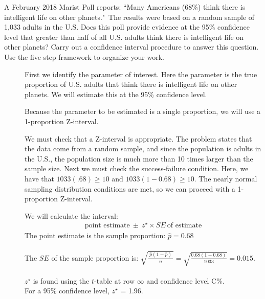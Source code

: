 \begin{examplewrap}
\begin{nexample}
{A February 2018 Marist Poll reports:  ``Many Americans (68\%) think there is intelligent life on other planets."\footnotemark\,  The results were based on a random sample of 1,033 adults in the U.S.  Does this poll provide evidence at the 95\% confidence level that greater than half of all U.S. adults think there is intelligent life on other planets?  Carry out a confidence interval procedure to answer this question.  Use the five step framework to organize your work.  
}
\label{IntelligentLife}
\begin{description}
\item[] First we identify the parameter of interest.  Here the parameter is the true proportion of U.S. adults that think there is intelligent life on other planets.  We will estimate this at the 95\% confidence level.  
\item[] Because the parameter to be estimated is a single proportion, we will use a 1-proportion Z-interval.
\item[] We must check that a Z-interval is appropriate.    The problem states that the data come from a random sample, and since the population is adults in the U.S., the population size is much more than 10 times larger than the sample size.  Next we must check the success-failure condition.  Here, we have that $1033(.68)\ge 10$ and $1033(1-0.68)\ge 10$.  The nearly normal sampling distribution conditions are met, so we can proceed with a 1-proportion Z-interval.
\item[]  We will calculate the interval:
\begin{align*}
 \text{point estimate}\ \pm\ z^{\star} \times SE\ \text{of estimate}
\end{align*}
The point estimate is the sample proportion:  $\hat{p} = 0.68$\\
\\ 
The $SE$ of the sample proportion is:  $\sqrt{\frac{\ \hat{p}(1-\hat{p})\ }{n}} = \sqrt{\frac{0.68(1-0.68)}{1033}}=0.015$.\\
\\
$z^{\star}$ is found using the $t$-table at row $\infty$ and confidence level C\%.  \\
For a 95\% confidence level, $z^{\star}$ = 1.96. \\


\end{description}
\end{nexample}
\end{examplewrap}
